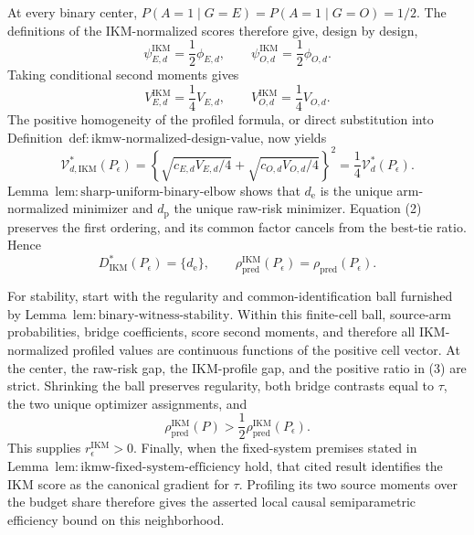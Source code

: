 At every binary center, \(P(A=1\mid G=E)=P(A=1\mid G=O)=1/2\). The definitions of the IKM-normalized scores therefore give, design by design,
\[
 \psi_{E,d}^{\mathrm{IKM}}=\frac12\phi_{E,d},
 \qquad
 \psi_{O,d}^{\mathrm{IKM}}=\frac12\phi_{O,d}.
\]
Taking conditional second moments gives
\[
 V_{E,d}^{\mathrm{IKM}}=\frac14V_{E,d},
 \qquad V_{O,d}^{\mathrm{IKM}}=\frac14V_{O,d}. \tag{1}
\]
The positive homogeneity of the profiled formula, or direct substitution into Definition~\(\mathrm{def{:}ikmw\text{-}normalized\text{-}design\text{-}value}\), now yields
\[
 \mathcal V_{d,\mathrm{IKM}}^*(P_\epsilon)
 =\left\{\sqrt{c_{E,d}V_{E,d}/4}+\sqrt{c_{O,d}V_{O,d}/4}\right\}^2
 =\frac14\mathcal V_d^*(P_\epsilon). \tag{2}
\]
Lemma~\(\mathrm{lem{:}sharp\text{-}uniform\text{-}binary\text{-}elbow}\) shows that \(d_{\mathrm e}\) is the unique arm-normalized minimizer and \(d_{\mathrm p}\) the unique raw-risk minimizer. Equation (2) preserves the first ordering, and its common factor cancels from the best-tie ratio. Hence
\[
 D_{\mathrm{IKM}}^*(P_\epsilon)=\{d_{\mathrm e}\},
 \qquad
 \rho_{\mathrm{pred}}^{\mathrm{IKM}}(P_\epsilon)
 =\rho_{\mathrm{pred}}(P_\epsilon). \tag{3}
\]

For stability, start with the regularity and common-identification ball furnished by Lemma~\(\mathrm{lem{:}binary\text{-}witness\text{-}stability}\). Within this finite-cell ball, source-arm probabilities, bridge coefficients, score second moments, and therefore all IKM-normalized profiled values are continuous functions of the positive cell vector. At the center, the raw-risk gap, the IKM-profile gap, and the positive ratio in (3) are strict. Shrinking the ball preserves regularity, both bridge contrasts equal to \(\tau\), the two unique optimizer assignments, and
\[
 \rho_{\mathrm{pred}}^{\mathrm{IKM}}(P)
 >\frac12\rho_{\mathrm{pred}}^{\mathrm{IKM}}(P_\epsilon).
\]
This supplies \(r_\epsilon^{\mathrm{IKM}}>0\). Finally, when the fixed-system premises stated in Lemma~\(\mathrm{lem{:}ikmw\text{-}fixed\text{-}system\text{-}efficiency}\) hold, that cited result identifies the IKM score as the canonical gradient for \(\tau\). Profiling its two source moments over the budget share therefore gives the asserted local causal semiparametric efficiency bound on this neighborhood.